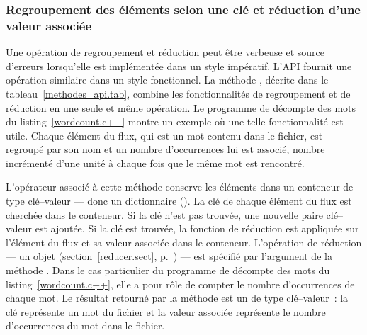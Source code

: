 \subsubsection{Regroupement des \'el\'ements selon une cl\'e et r\'eduction d'une valeur associ\'ee}

Une op\'eration de regroupement et r\'eduction peut \^etre verbeuse et source d'erreurs lorsqu'elle est impl\'ement\'ee dans un style imp\'eratif. L'{API} fournit une op\'eration similaire dans un style fonctionnel. La m\'ethode , d\'ecrite dans le tableau~\ref{methodes_api.tab}, combine les fonctionnalit\'es de regroupement et de r\'eduction en une seule et m\^eme op\'eration. Le programme de d\'ecompte des mots du listing~\ref{wordcount.c++} montre un exemple o\`u une telle fonctionnalit\'e est utile. Chaque \'el\'ement du flux, qui est un mot contenu dans le fichier, est regroup\'e par son nom et un nombre d'occurrences lui est associ\'e, nombre incr\'ement\'e d'une unit\'e \`a chaque fois que le m\^eme mot est rencontr\'e.

L'opérateur  associ\'e \`a cette m\'ethode conserve les \'el\'ements dans un conteneur de type cl\'e--valeur --- donc un dictionnaire (). La cl\'e de chaque \'el\'ement du flux est cherch\'ee dans le conteneur. Si la cl\'e n'est pas trouv\'ee, une nouvelle paire cl\'e--valeur est ajout\'ee. Si la cl\'e est trouv\'ee, la fonction de r\'eduction est appliqu\'ee sur l'\'el\'ement du flux et sa valeur associ\'ee dans le conteneur. L'op\'eration de r\'eduction --- un objet  (section~\ref{reducer.sect}, p.~\pageref{reducer.sect})  --- est sp\'ecifi\'e par l'argument de la m\'ethode . Dans le cas particulier du programme de d\'ecompte des mots du listing~\ref{wordcount.c++}, elle a pour r\^ole de compter le nombre d'occurrences de chaque mot. Le r\'esultat retourn\'e par la m\'ethode  est un  de type cl\'e--valeur~: la cl\'e repr\'esente un mot du fichier et la valeur associ\'ee repr\'esente le nombre d'occurrences du mot dans le fichier.



